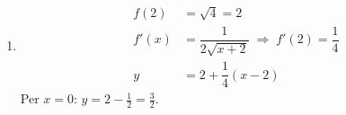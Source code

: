 \begin{question}[ID=2.2, subtitle={Retta tangente con verifica intersezione asse $y$}, tags={derivate, retta tangente}, difficulty=media]
\begin{explanation}
\begin{enumerate}[label=\arabic*)]
\[\begin{aligned}
    y &= \dfrac12-\dfrac{\sqrt3}{2}\left(x-\dfrac\pi3\right)
    \end{aligned}\]
    Per $x=0$: $y=\tfrac12+\tfrac{\sqrt3}{2}\cdot\tfrac\pi3=\tfrac12+\tfrac{\sqrt3\,\pi}{6}\approx1{,}41$.
    \item \[\begin{aligned}
    f(2) &= \sqrt4=2\\
    f'(x) &= \dfrac{1}{2\sqrt{x+2}} \;\Rightarrow\; f'(2)=\dfrac14\\
    y &= 2+\dfrac14(x-2)
    \end{aligned}\]
    Per $x=0$: $y=2-\tfrac12=\tfrac32$.
\end{enumerate}
\end{explanation}
\end{question}


